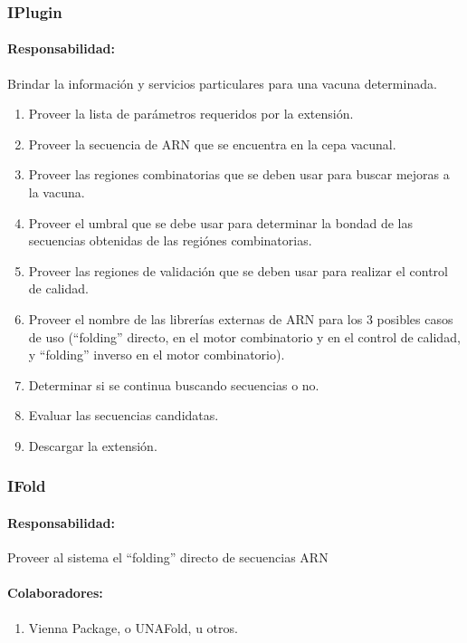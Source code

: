   \subsubsection{IPlugin}
    \paragraph{Responsabilidad:} Brindar la informaci\'on y servicios
particulares para una vacuna determinada.    
      \begin{enumerate}
       \item Proveer la lista de par\'ametros requeridos por la extensi\'on.
       \item Proveer la secuencia de ARN que se encuentra en la cepa vacunal.
       \item Proveer las regiones combinatorias que se deben usar para buscar
mejoras a la vacuna.
       \item Proveer el umbral que se debe usar para determinar la bondad de las
secuencias obtenidas de las regi\'ones combinatorias.
       \item Proveer las regiones de validaci\'on que se deben usar para
realizar el control de calidad.
       \item Proveer el nombre de las librer\'ias externas de ARN para los 3
posibles casos de uso (``folding'' directo, en el motor combinatorio y en el
control de calidad, y ``folding'' inverso en el motor combinatorio).
       \item Determinar si se continua buscando secuencias o no.
       \item Evaluar las secuencias candidatas.
       \item Descargar la extensi\'on.
      \end{enumerate}  

  \subsubsection{IFold}
    \paragraph{Responsabilidad:} Proveer al sistema el ``folding'' directo de
secuencias ARN
    \paragraph{Colaboradores:}
      \begin{enumerate}
       \item Vienna Package, o UNAFold, u otros.
      \end{enumerate}

